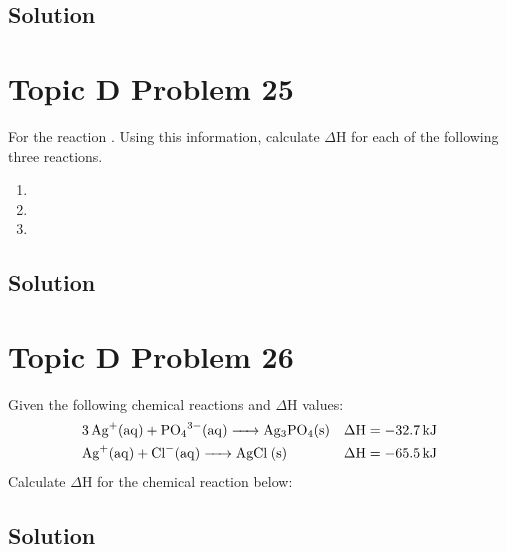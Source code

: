 \documentclass[10pt]{article}
\begin{document}
        \subsection{Solution}



    \pagebreak
    \section{Topic D Problem 25}
        For the reaction . 
        Using this information, calculate $\Delta$H for each of the following three reactions.
        \begin{enumerate}[label=\alph*)]
            \item   {}
            \item   {}
            \item   {}
        \end{enumerate}

        \subsection{Solution}



    \pagebreak
    \section{Topic D Problem 26}
        Given the following chemical reactions and $\Delta$H values:
        \begin{align*}
            &\ce{3 Ag+(aq) + PO4^3-(aq) -> Ag3PO4(s)}   &\rm \Delta H = -32.7\,\unit{\kilo\joule}\\
            &\ce{Ag+(aq) + Cl-(aq) -> AgCl (s)}         &\rm \Delta H = -65.5\,\unit{\kilo\joule}
        \end{align*}
        Calculate $\Delta$H for the chemical reaction below:
        \begin{center}
        \end{center}

        \subsection{Solution}
\end{document}
